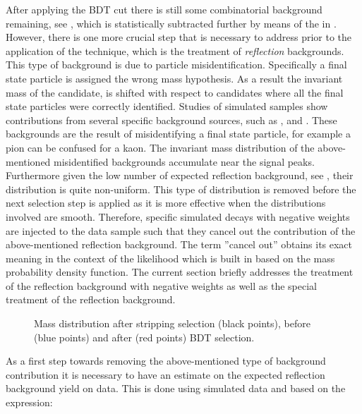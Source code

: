 After applying the BDT cut there is still some combinatorial background remaining, see ,
which is statistically subtracted further by means of the \sWeights in .
However, there is one more crucial step that is necessary to address prior to the application of the
\sPlot technique, which is the treatment of {\it reflection} backgrounds. This type of background is due to particle misidentification.
Specifically a final state particle is assigned the wrong mass hypothesis. As a result the invariant mass of the \Bs candidate,
is shifted with respect to \Bs candidates where all the final state particles were correctly identified.
Studies of simulated samples show contributions
from several specific background sources, such as \BsJpsiKK, \BsJpsipipi and \BdJpsipipi.
These backgrounds are the result of misidentifying a final state particle, for example a pion can
be confused for a kaon. The invariant mass distribution of the above-mentioned misidentified backgrounds
accumulate near the \BJpsiKpi signal peaks. Furthermore given the low number of expected reflection background,
see , their distribution is quite non-uniform. This type of distribution is
removed before the next selection step is applied as it is more effective when the distributions involved are smooth.
Therefore, specific simulated decays with negative weights
are injected to the data sample such that they cancel out the contribution of the above-mentioned reflection
background. The term ''cancel out'' obtains its exact meaning in the context of the likelihood which is
built in  based on the mass probability density function.
The current section briefly addresses the treatment of the reflection background with negative weights
as well as the special treatment of the \LbJpsippi reflection background.

\begin{figure}[!t]
  \centering
  \scalebox{1}{}
  \caption{Mass distribution after stripping selection (black points), before (blue points) and after (red points) BDT selection.}
  \label{mass_BDTG_selection}
\end{figure}

As a first step towards removing the above-mentioned type of background contribution it is necessary to have an estimate
on the expected reflection background yield on data. This is done using simulated data and based on the expression:

